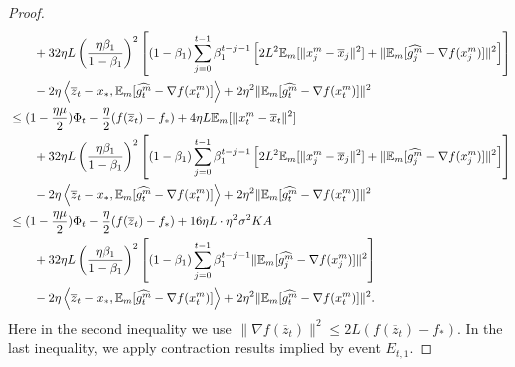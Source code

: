 \documentclass{article} %
\numberwithin{equation}{section}
\begin{document}
\begin{proof}
\begin{equation}
\begin{aligned}
            &\qquad + 32\eta L\left(\frac{\eta\beta_1}{1-\beta_1}\right)^2\left[(1-\beta_1)\sum_{j=0}^{t-1}\beta_1^{t-j-1}\left[2L^2\mathbb{E}_m[\|x_j^m-\overline{x}_j\|^2]+\|\mathbb{E}_m[\widehat{g_j^m}-\nabla f(x_j^m)]\|^2 \right]\right] \\
            &\qquad - 2\eta \left\langle\overline{z}_t-x_*, \mathbb{E}_m [\widehat{g_t^m}-\nabla f(x_t^m)]\right\rangle + 2\eta^2\|\mathbb{E}_m [\widehat{g_t^m}-\nabla f(x_t^m)]\|^2 \\
            &\leq (1-\frac{\eta\mu}{2}) \Phi_t - \frac{\eta}{2} (f(\overline{z}_t)-f_*) + 4\eta L \mathbb{E}_m[\|x_t^m-\overline{x}_t\|^2]\\
            &\qquad + 32\eta L\left(\frac{\eta\beta_1}{1-\beta_1}\right)^2\left[(1-\beta_1)\sum_{j=0}^{t-1}\beta_1^{t-j-1}\left[2L^2\mathbb{E}_m[\|x_j^m-\overline{x}_j\|^2]+\|\mathbb{E}_m[\widehat{g_j^m}-\nabla f(x_j^m)]\|^2 \right]\right] \\
            &\qquad - 2\eta \left\langle\overline{z}_t-x_*, \mathbb{E}_m [\widehat{g_t^m}-\nabla f(x_t^m)]\right\rangle + 2\eta^2\|\mathbb{E}_m [\widehat{g_t^m}-\nabla f(x_t^m)]\|^2 \\
            &\leq (1-\frac{\eta\mu}{2}) \Phi_t - \frac{\eta}{2} (f(\overline{z}_t)-f_*) + 16\eta L \cdot \eta^2\sigma^2KA \\
            &\qquad + 32\eta L\left(\frac{\eta\beta_1}{1-\beta_1}\right)^2\left[(1-\beta_1)\sum_{j=0}^{t-1}\beta_1^{t-j-1}\|\mathbb{E}_m[\widehat{g_j^m}-\nabla f(x_j^m)]\|^2 \right] \\
            &\qquad - 2\eta \left\langle\overline{z}_t-x_*, \mathbb{E}_m [\widehat{g_t^m}-\nabla f(x_t^m)]\right\rangle + 2\eta^2\|\mathbb{E}_m [\widehat{g_t^m}-\nabla f(x_t^m)]\|^2.
        \end{aligned}
    \end{equation}
    Here in the second inequality we use $\|\nabla f(\overline{z}_t)\|^2\leq 2L(f(\overline{z}_t)-f_*)$.
    In the last inequality, we apply contraction results implied by event $E_{t,1}$.
    

\end{proof}
\end{document}

